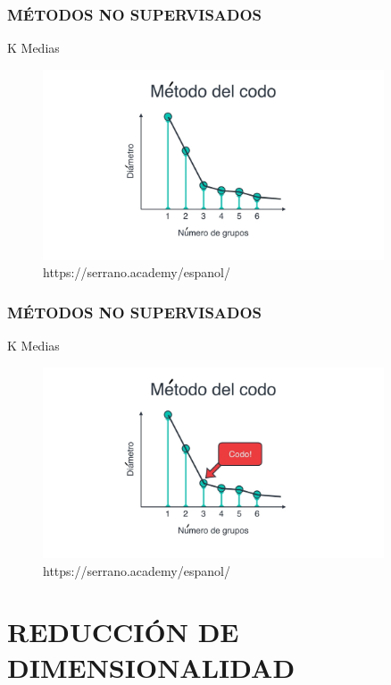 \documentclass{beamer}
\begin{document}
\begin{frame}
	\frametitle{MÉTODOS NO SUPERVISADOS}
	\begin{block}{K Medias}	
		\begin{figure}
			\includegraphics[width=0.9\textwidth]{Imagenes_k_means/IMG_3523.jpg}
			\caption{https://serrano.academy/espanol/}
		\end{figure}
	\end{block}
\end{frame}

\begin{frame}
	\frametitle{MÉTODOS NO SUPERVISADOS}
	\begin{block}{K Medias}	
		\begin{figure}
			\includegraphics[width=0.9\textwidth]{Imagenes_k_means/IMG_3524.jpg}
			\caption{https://serrano.academy/espanol/}
		\end{figure}
	\end{block}
\end{frame}


\section{REDUCCIÓN DE DIMENSIONALIDAD}
\end{document}
